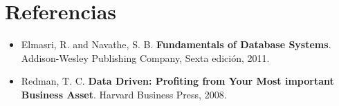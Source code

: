 \documentclass[letterpaper,12pt]{article}
\begin{document}
            \section*{Referencias}
            \begin{itemize}

            	\item Elmasri, R. and Navathe, S. B. \textbf{Fundamentals of Database Systems}. Addison-Wesley Publishing Company, Sexta edición, 2011.
            	\item Redman, T. C. \textbf{Data Driven: Profiting from Your Most important Business Asset}. Harvard Business Press, 2008.

            \end{itemize}

            
\end{document}
